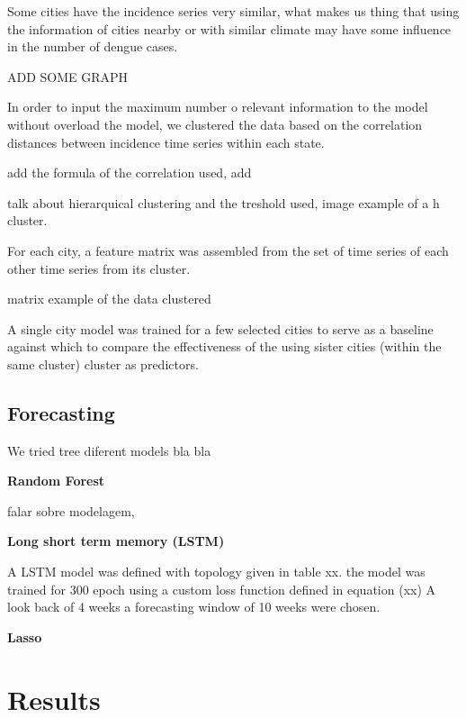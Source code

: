 \documentclass[12pt]{report}
\begin{document}
Some cities have the incidence series very similar, what makes us thing that using the information 
of cities nearby or with similar climate may have some influence in the number of dengue cases.

ADD SOME GRAPH 

In order to input the maximum number o relevant information to the model without overload the model,
we clustered the data based on the correlation distances between incidence time series within each state.

add the formula of the correlation used, add

talk about hierarquical clustering and the treshold used, image example of a h cluster.

For each city, a feature matrix was assembled from the set of time series of 
each other time series from its cluster.

matrix example of the data clustered

A single city model was trained for a few selected cities to serve as a 
baseline against which to compare the effectiveness of the using sister 
cities (within the same cluster) cluster as predictors.

\subsection{Forecasting}

We tried tree diferent models bla bla


\begin{description}
 \item \textbf{Random Forest}
 
 falar sobre modelagem, 
 \item \textbf{Long short term memory (LSTM)}
 
 A LSTM model was defined with topology given in table xx. the model was trained 
for 300 epoch using a custom loss function defined in equation (xx) A look back 
of 4 weeks a forecasting window of 10 weeks were chosen.

 
 \item \textbf{Lasso}
 
\end{description}


\section{Results}
\end{document}
